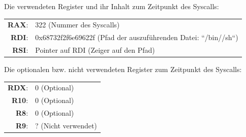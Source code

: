 Die verwendeten Register und ihr Inhalt zum Zeitpunkt des Syscalls:

    \begin{tabular}{rl}
         {\textbf{RAX}:}& {322 (Nummer des Syscalls)}\\
         {\textbf{RDI}:}& {0x68732f2f6e69622f (Pfad der auszuführenden Datei: ``/bin//sh``)}\\
         {\textbf{RSI}:}& {Pointer auf RDI (Zeiger auf den Pfad)}
    \end{tabular}

    
Die optionalen bzw. nicht verwendeten Register zum Zeitpunkt des Syscalls:

    \begin{tabular}{rl}
        {\textbf{RDX}:}& {0 (Optional)}\\
        {\textbf{R10}:}& {0 (Optional)}\\
        {\textbf{R8}:}& {0 (Optional)}\\
        {\textbf{R9}:}& {? (Nicht verwendet)}
    \end{tabular}
    

